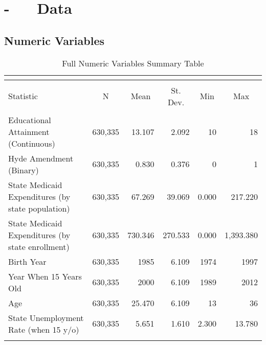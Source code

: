 \section{ - ~~ Data}
\subsection{Numeric Variables}
    \begingroup\tiny
    \begin{longtable}{l|rrrrr}
    \caption{Full Numeric Variables Summary Table} \\
    \label{app_num.var_table} 
    \\ [-4ex]\hline 
    \hline \\[-4ex] 
    Statistic & \multicolumn{1}{c}{N} & \multicolumn{1}{c}{Mean} & \multicolumn{1}{c}{St. Dev.} & \multicolumn{1}{c}{Min} & \multicolumn{1}{c}{Max} \\ 
    \hline \\[-4ex] 
    Educational Attainment (Continuous) & 630,335 & 13.107 & 2.092 & 10 & 18 \\
    Hyde Amendment (Binary) & 630,335 & 0.830 & 0.376 & 0 & 1 \\ 
    State Medicaid Expenditures (by state population) & 630,335 & 67.269 & 39.069 & 0.000 & 217.220 \\ 
    State Medicaid Expenditures (by state enrollment) & 630,335 & 730.346 & 270.533 & 0.000 & 1,393.380 \\ 
    Birth Year & 630,335 & 1985 & 6.109 & 1974 & 1997 \\ 
    Year When 15 Years Old & 630,335 & 2000 & 6.109 & 1989 & 2012 \\ 
    Age & 630,335 & 25.470 & 6.109 & 13 & 36 \\ 
    State Unemployment Rate (when 15 y/o) & 630,335 & 5.651 & 1.610 & 2.300 & 13.780 \\ 
    \hline \\[-4ex] 
    \end{longtable}
    \endgroup

